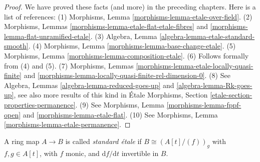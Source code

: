 \begin{proof}
We have proved these facts (and more) in the preceding chapters.
Here is a list of references:
(1) Morphisms, Lemma \ref{morphisms-lemma-etale-over-field}.
(2) Morphisms, Lemmas \ref{morphisms-lemma-etale-flat-etale-fibres}
and \ref{morphisms-lemma-flat-unramified-etale}.
(3) Algebra, Lemma \ref{algebra-lemma-etale-standard-smooth}.
(4) Morphisms, Lemma \ref{morphisms-lemma-base-change-etale}.
(5) Morphisms, Lemma \ref{morphisms-lemma-composition-etale}.
(6) Follows formally from (4) and (5).
(7) Morphisms, Lemmas \ref{morphisms-lemma-etale-locally-quasi-finite}
and \ref{morphisms-lemma-locally-quasi-finite-rel-dimension-0}.
(8) See Algebra, Lemmas \ref{algebra-lemma-reduced-goes-up} and
\ref{algebra-lemma-Rk-goes-up}, see also more results of this kind
in \'Etale Morphisms, Section \ref{etale-section-properties-permanence}.
(9) See Morphisms, Lemma \ref{morphisms-lemma-fppf-open} and
\ref{morphisms-lemma-etale-flat}.
(10) See Morphisms, Lemma \ref{morphisms-lemma-etale-permanence}.
\end{proof}

\begin{definition}
\label{definition-standard-etale}
A ring map $A \to B$ is called {\it standard \'etale} if
$B \cong \left(A[t]/(f)\right)_g$ with $f, g \in A[t]$, with $f$ monic,
and $\text{d}f/\text{d}t$ invertible in $B$.
\end{definition}

